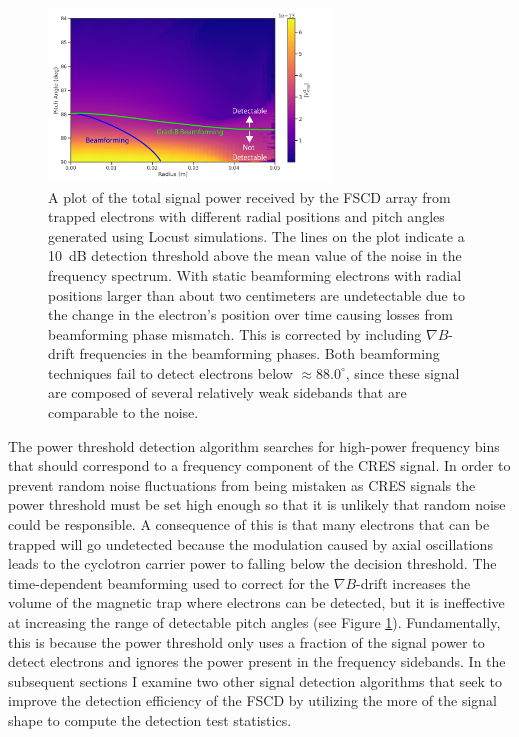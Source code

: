 \begin{figure}[htbp]
    \centering
    \includegraphics[width=0.67\textwidth]{figs/Chapter-4/230522_beamforming_detectability.png}
    \caption{A plot of the total signal power received by the FSCD array from trapped electrons with different radial positions and pitch angles generated using Locust simulations. The lines on the plot indicate a 10~dB detection threshold above the mean value of the noise in the frequency spectrum. With static beamforming electrons with radial positions larger than about two centimeters are undetectable due to the change in the electron's position over time causing losses from beamforming phase mismatch. This is corrected by including $\nabla B$-drift frequencies in the beamforming phases. Both beamforming techniques fail to detect electrons below $\approx 88.0^\circ$, since these signal are composed of several relatively weak sidebands that are comparable to the noise.}
    \label{fig:chap4-detection-boundaries}
\end{figure}

The power threshold detection algorithm searches for high-power frequency bins that should correspond to a frequency component of the CRES signal. In order to prevent random noise fluctuations from being mistaken as CRES signals the power threshold must be set high enough so that it is unlikely that random noise could be responsible. A consequence of this is that many electrons that can be trapped will go undetected because the modulation caused by axial oscillations leads to the cyclotron carrier power to falling below the decision threshold. The time-dependent beamforming used to correct for the $\nabla B$-drift increases the volume of the magnetic trap where electrons can be detected, but it is ineffective at increasing the range of detectable pitch angles (see Figure \ref{fig:chap4-detection-boundaries}). Fundamentally, this is because the power threshold only uses a fraction of the signal power to detect electrons and ignores the power present in the frequency sidebands. In the subsequent sections I examine two other signal detection algorithms that seek to improve the detection efficiency of the FSCD by utilizing the more of the signal shape to compute the detection test statistics.

